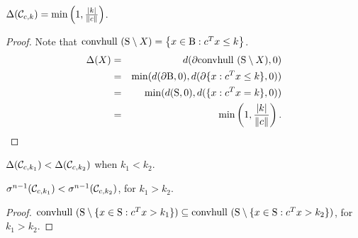 \begin{lemma}\label{lemma:delta2}$\Delta(\mathcal{C}_{c,k}) = \min\left(1, \frac{|k|}{\|c\|}\right)$.
\end{lemma}

\begin{proof}
Note that $\mbox{convhull }(\text{S} \setminus X)= \left\{x \in \text{B} : c^Tx \leq k \right\}$.
\begin{eqnarray}
\nonumber \Delta(X) &=& d(\partial \mbox{convhull }(\text{S} \setminus X), 0) \\
\nonumber &=& \min(d(\partial \text{B}, 0), d(\partial\{x : c^Tx \leq k\}, 0)) \\
\nonumber &=& \min(d(\text{S}, 0), d(\{x : c^Tx = k\}, 0)) \\
\nonumber &=& \min\left(1, \frac{|k|}{\|c\|}\right).
\end{eqnarray}
\end{proof}
%

\begin{corollary}\label{lemma:deltaMonotone}$\Delta(\mathcal{C}_{c,k_1}) < \Delta(\mathcal{C}_{c,k_2})$ when $k_1 < k_2$.
\end{corollary}

\begin{lemma}\label{lemma:muMonotone}$\sigma^{n-1}(\mathcal{C}_{c,k_1}) < \sigma^{n-1}(\mathcal{C}_{c,k_2})$, for $k_1 > k_2$.
\end{lemma}

\begin{proof}$\mbox{convhull }(\text{S} \setminus \{x\in \text{S}: c^Tx >k_1\}) \subseteq \mbox{convhull }(\text{S} \setminus \{x\in \text{S}: c^Tx >k_2\})$, for $k_1 > k_2$.
\end{proof}


